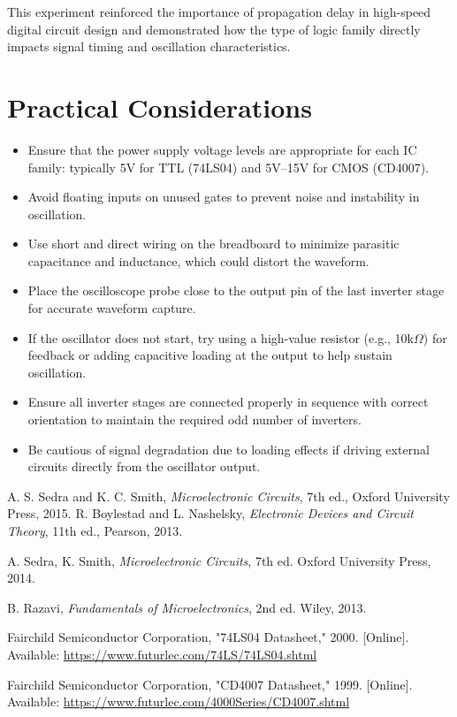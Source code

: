 \documentclass[conference]{IEEEtran}
\begin{document}
\noindent This experiment reinforced the importance of propagation delay in high-speed digital circuit design and demonstrated how the type of logic family directly impacts signal timing and oscillation characteristics.

\section{Practical Considerations}
\begin{itemize}
    \item Ensure that the power supply voltage levels are appropriate for each IC family: typically 5V for TTL (74LS04) and 5V–15V for CMOS (CD4007).
    \item Avoid floating inputs on unused gates to prevent noise and instability in oscillation.
    \item Use short and direct wiring on the breadboard to minimize parasitic capacitance and inductance, which could distort the waveform.
    \item Place the oscilloscope probe close to the output pin of the last inverter stage for accurate waveform capture.
    \item If the oscillator does not start, try using a high-value resistor (e.g., 10k$\Omega$) for feedback or adding capacitive loading at the output to help sustain oscillation.
    \item Ensure all inverter stages are connected properly in sequence with correct orientation to maintain the required odd number of inverters.
    \item Be cautious of signal degradation due to loading effects if driving external circuits directly from the oscillator output.
\end{itemize}


\begin{thebibliography}{9}
 A. S. Sedra and K. C. Smith, \textit{Microelectronic Circuits}, 7th ed., Oxford University Press, 2015.
 R. Boylestad and L. Nashelsky, \textit{Electronic Devices and Circuit Theory}, 11th ed., Pearson, 2013.

	
    A. Sedra, K. Smith, \textit{Microelectronic Circuits}, 7th ed. Oxford University Press, 2014.

    B. Razavi, \textit{Fundamentals of Microelectronics}, 2nd ed. Wiley, 2013.

     Fairchild Semiconductor Corporation, "74LS04 Datasheet," 2000. [Online]. Available: \url{https://www.futurlec.com/74LS/74LS04.shtml}

     Fairchild Semiconductor Corporation, "CD4007 Datasheet," 1999. [Online]. Available: \url{https://www.futurlec.com/4000Series/CD4007.shtml}
    

\end{thebibliography}
\end{document}
